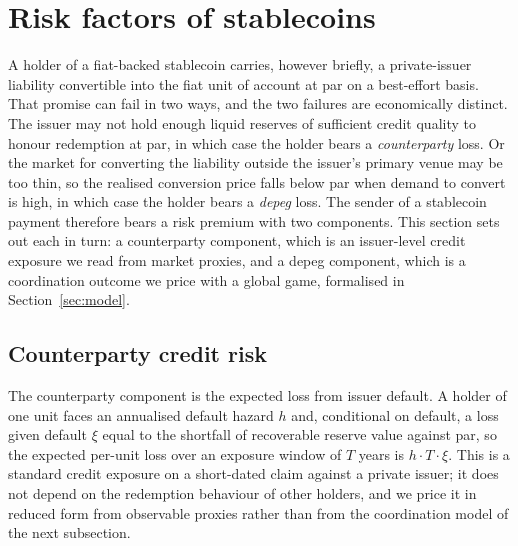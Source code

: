 \section{Risk factors of stablecoins}\label{sec:risk_factors}

A holder of a fiat-backed stablecoin carries, however briefly, a private-issuer liability convertible into the fiat unit of account at par on a best-effort basis. That promise can fail in two ways, and the two failures are economically distinct. The issuer may not hold enough liquid reserves of sufficient credit quality to honour redemption at par, in which case the holder bears a \emph{counterparty} loss. Or the market for converting the liability outside the issuer's primary venue may be too thin, so the realised conversion price falls below par when demand to convert is high, in which case the holder bears a \emph{depeg} loss. The sender of a stablecoin payment therefore bears a risk premium with two components. This section sets out each in turn: a counterparty component, which is an issuer-level credit exposure we read from market proxies, and a depeg component, which is a coordination outcome we price with a global game, formalised in Section~\ref{sec:model}.

\subsection{Counterparty credit risk}\label{sub:counterparty}

The counterparty component is the expected loss from issuer default. A holder of one unit faces an annualised default hazard $h$ and, conditional on default, a loss given default $\xi$ equal to the shortfall of recoverable reserve value against par, so the expected per-unit loss over an exposure window of $T$ years is $h \cdot T \cdot \xi$. This is a standard credit exposure on a short-dated claim against a private issuer; it does not depend on the redemption behaviour of other holders, and we price it in reduced form from observable proxies rather than from the coordination model of the next subsection.

